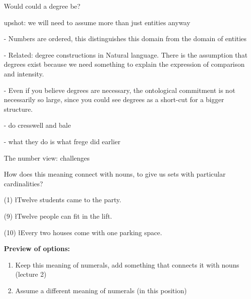 \documentclass[pdf,12pt]{beamer}
\begin{document}
\begin{frame}{Would could a degree be?}
{upshot: we will need to assume more than just entities anyway

  - Numbers are ordered, this distinguishes this domain from the domain of entities

  - Related: degree constructions in Natural language. There is the assumption that degrees exist because we need something to explain the expression of comparison and intensity.

  - Even if you believe degrees are necessary, the ontological commitment is not necessarily so large, since you could see degrees as a short-cut for a bigger structure.

  - do cresswell and bale

  - what they do is what frege did earlier
 } 
  

\end{frame}

\begin{frame}{The number view: challenges}

  How does this meaning connect with nouns, to give us sets with particular cardinalities?

  (1) \l{Twelve students came to the party.}

  (9) \l{Twelve people can fit in the lift.}
  
  (10) \l{Every two houses come with one parking space.}


  \pause \vfill

  {\bf Preview of options:}
\begin{enumerate}
\item  Keep this meaning of numerals, add something that connects it with nouns (lecture 2)
\item Assume a different meaning of numerals (in this position)
\end{enumerate}    
   
\end{frame}
\end{document}
